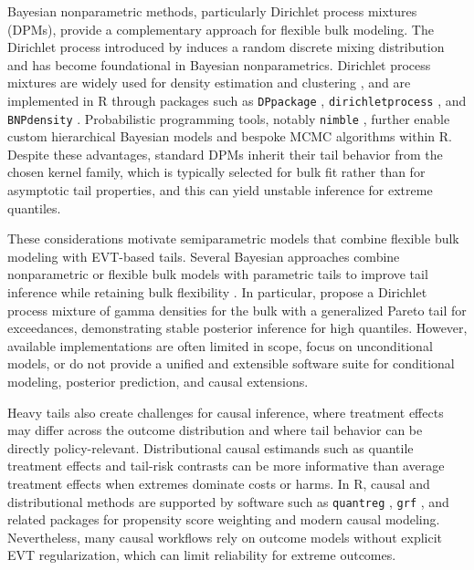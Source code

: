 \documentclass[article]{jss}\usepackage[]{graphicx}\usepackage[]{xcolor}
\begin{document}
Bayesian nonparametric methods, particularly Dirichlet process mixtures (DPMs), provide a complementary approach for flexible bulk modeling.
The Dirichlet process introduced by \citet{Ferguson1973} induces a random discrete mixing distribution and has become foundational in Bayesian nonparametrics.
Dirichlet process mixtures are widely used for density estimation and clustering \citep{Lo1984,EscobarWest1995,Neal2000}, and are implemented in \textsf{R} through packages such as \texttt{DPpackage} \citep{Jara2011}, \texttt{dirichletprocess} \citep{RossMarkwick2023}, and \texttt{BNPdensity} \citep{Arbel2021BNPdensity}.
Probabilistic programming tools, notably \texttt{nimble} \citep{DeValpine2017}, further enable custom hierarchical Bayesian models and bespoke MCMC algorithms within \textsf{R}.
Despite these advantages, standard DPMs inherit their tail behavior from the chosen kernel family, which is typically selected for bulk fit rather than for asymptotic tail properties, and this can yield unstable inference for extreme quantiles.

These considerations motivate semiparametric models that combine flexible bulk modeling with EVT-based tails.
Several Bayesian approaches combine nonparametric or flexible bulk models with parametric tails to improve tail inference while retaining bulk flexibility \citep{DoNascimento2012,FuquenePatino2015,CabrasCastellanos2011}.
In particular, \citet{FuquenePatino2015} propose a Dirichlet process mixture of gamma densities for the bulk with a generalized Pareto tail for exceedances, demonstrating stable posterior inference for high quantiles.
However, available implementations are often limited in scope, focus on unconditional models, or do not provide a unified and extensible software suite for conditional modeling, posterior prediction, and causal extensions.

Heavy tails also create challenges for causal inference, where treatment effects may differ across the outcome distribution and where tail behavior can be directly policy-relevant.
Distributional causal estimands such as quantile treatment effects \citep{FirpoFortinLemieux2009,Chernozhukov2013} and tail-risk contrasts can be more informative than average treatment effects when extremes dominate costs or harms.
In \textsf{R}, causal and distributional methods are supported by software such as \texttt{quantreg} \citep{Koenker2005}, \texttt{grf} \citep{AtheyTibshiraniWager2019}, and related packages for propensity score weighting and modern causal modeling.
Nevertheless, many causal workflows rely on outcome models without explicit EVT regularization, which can limit reliability for extreme outcomes.
\end{document}
